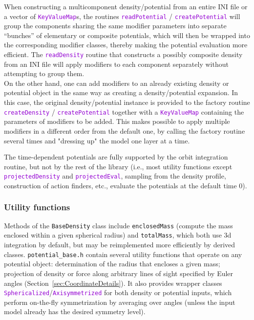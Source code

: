 \documentclass[12pt]{article}
\newcommand{\ttt}[1]{\textcolor{darkviolet}{\texttt{#1}}}
\begin{document}
\begin{itemize}
%
When constructing a multicomponent density/potential from an entire INI file or a vector of \ttt{KeyValueMap}s, the routines \ttt{readPotential} / \ttt{createPotential} will group the components sharing the same modifier parameters into separate ``bunches'' of elementary or composite potentials, which will then be wrapped into the corresponding modifier classes, thereby making the potential evaluation more efficient. The \ttt{readDensity} routine that constructs a possibly composite density from an INI file will apply modifiers to each component separately without attempting to group them.\\
%
On the other hand, one can add modifiers to an already existing density or potential object in the same way as creating a density/potential expansion. In this case, the original density/potential instance is provided to the factory routine \ttt{createDensity} / \ttt{createPotential} together with a \ttt{KeyValueMap} containing the parameters of modifiers to be added. This makes possible to apply multiple modifiers in a different order from the default one, by calling the factory routine several times and "dressing up" the model one layer at a time.
\end{itemize}

The time-dependent potentials are fully supported by the orbit integration routine, but not by the rest of the library (i.e., most utility functions except \ttt{projectedDensity} and \ttt{projectedEval}, sampling from the density profile, construction of action finders, etc., evaluate the potentials at the default time 0).

\subsubsection{Utility functions}  \label{sec:PotentialUtility}

Methods of the \texttt{BaseDensity} class include \texttt{enclosedMass} (compute the mass enclosed within a given spherical radius) and \texttt{totalMass}, which both use 3d integration by default, but may be reimplemented more efficiently by derived classes. \texttt{potential_base.h} contain several utility functions that operate on any potential object: determination of the radius that encloses a given mass; projection of density or force along arbitrary lines of sight specified by Euler angles (Section~\ref{sec:CoordinateDetails}). It also provides wrapper classes \ttt{Sphericalized}/\ttt{Axisymmetrized} for both density or potential inputs, which perform on-the-fly symmetrization by averaging over angles (unless the input model already has the desired symmetry level). 
\end{document}
